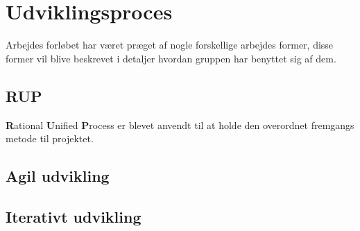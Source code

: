 \chapter{Udviklingsproces}
Arbejdes forløbet har været præget af nogle forskellige arbejdes former, disse former vil blive beskrevet i detaljer hvordan gruppen har benyttet sig af dem.

\section{RUP}
\textbf{R}ational \textbf{U}nified \textbf{P}rocess er blevet anvendt til at holde den overordnet fremgangs metode til projektet.  

\section{Agil udvikling}


\section{Iterativt udvikling}

